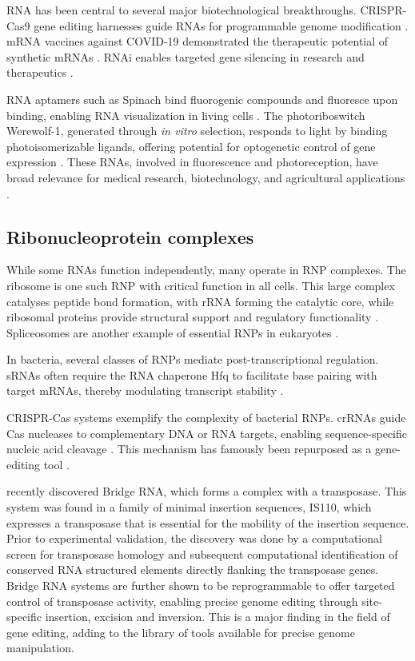 RNA has been central to several major biotechnological breakthroughs. 
\ac{CRISPR}-Cas9 gene editing harnesses guide RNAs for programmable genome modification \citep{Jinek2012}. 
\ac{mRNA} vaccines against \ac{COVID-19} demonstrated the therapeutic potential of synthetic \acp{mRNA} \citep{Leong2025}. 
\ac{RNAi} enables targeted gene silencing in research and therapeutics \citep{Fire1998}.

RNA aptamers such as Spinach bind fluorogenic compounds and fluoresce upon binding, enabling RNA visualization in living cells \citep{Paige2011}.
The photoriboswitch Werewolf-1, generated through \emph{in vitro} selection, responds to light by binding photoisomerizable ligands, offering potential for optogenetic control of gene expression \citep{Rotstan2020}.
These RNAs, involved in fluorescence and photoreception, have broad relevance for medical research, biotechnology, and agricultural applications \citep{Micura2020}.

\subsection{Ribonucleoprotein complexes}

While some RNAs function independently, many operate in \ac{RNP} complexes.
The ribosome is one such \ac{RNP} with critical function in all cells.
This large complex catalyses peptide bond formation, with \ac{rRNA} forming the catalytic core, while ribosomal proteins provide structural support and regulatory functionality \citep{Wahl2009}.
Spliceosomes are another example of essential \acp{RNP} in eukaryotes \citep{Wahl2009}.

In bacteria, several classes of \acp{RNP} mediate post-transcriptional regulation. 
\Acp{sRNA} often require the RNA chaperone Hfq to facilitate base pairing with target mRNAs, thereby modulating transcript stability \citep{Vogel2006}.

\ac{CRISPR}-Cas systems exemplify the complexity of bacterial \acp{RNP}.
\Acp{crRNA} guide Cas nucleases to complementary DNA or RNA targets, enabling sequence-specific nucleic acid cleavage \citep{Barrangou2007}.
This mechanism has famously been repurposed as a gene-editing tool \citep{Jinek2012}.

\citet{Durrant2024} recently discovered Bridge RNA, which forms a complex with a transposase.
This system was found in a family of minimal insertion sequences, IS110, which expresses a transposase that is essential for the mobility of the insertion sequence.
Prior to experimental validation, the discovery was done by a computational screen for transposase homology and subsequent computational identification of conserved RNA structured elements directly flanking the transposase genes.
Bridge RNA systems are further shown to be reprogrammable to offer targeted control of transposase activity, enabling precise genome editing through site-specific insertion, excision and inversion.
This is a major finding in the field of gene editing, adding to the library of tools available for precise genome manipulation.

